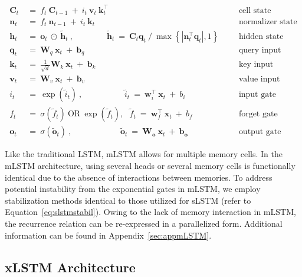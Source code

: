 \begin{align}
\label{eq:mlstm_recurrent_begin}
\mathbf{C}_t \ &= \  f_t \ \mathbf{C}_{t-1} \ + \ 
  i_t \ \mathbf{v}_t \ \mathbf{k}_t^\top & &  &\text{cell state} \\
\mathbf{n}_t \ &= \  f_t \ \mathbf{n}_{t-1} \ + \ 
  i_t \ \mathbf{k}_t & &  &\text{normalizer state} \\
\mathbf{h}_t  \ &= \ \mathbf{o}_t \ \odot \ \tilde{\mathbf{h}}_t
\ , \qquad \qquad 
\tilde{\mathbf{h}}_t \ = \   \mathbf{C}_t \mathbf{q}_t \ / \ 
  \max \left\{ |\mathbf{n}_t^\top \mathbf{q}_t|, 1 \right\} 
   &&&\text{hidden state} \\
\mathbf{q}_t \ &= \ \mathbf{W}_q \ \mathbf{x}_t \ + \ \mathbf{b}_q  & &  &\text{query input} \\
\mathbf{k}_t \ &= \ \frac{1}{\sqrt{d}} \mathbf{W}_k \ \mathbf{x}_t \ + \ \mathbf{b}_k  & &  &\text{key input} \\
\mathbf{v}_t \ &= \ \mathbf{W}_v \ \mathbf{x}_t \ + \ \mathbf{b}_v  & &  &\text{value input} \\
i_t \ &= \ \!\exp \!  \! \left( \tilde{i}_t  \right) \ , 
 \qquad \qquad \ \ \ \ \,
  \tilde{i}_t \ = \ \mathbf{w}^\top_{i} \ \mathbf{x}_t \ + \  b_{i} \ \ \ 
  &&&\text{input gate} \\
f_t \ &= \ \sigma \!  \left(  \tilde{f}_t \right) \ \text{OR} \ \!\exp \!  \! \left(  \tilde{f}_t \right) , \ \ \: \!
\tilde{f}_t \ = \ \mathbf{w}^\top_{f} \ \mathbf{x}_t  \ + \
  b_{f}
  &&& \text{forget gate} \\
\label{eq:mlstm_recurrent_end}
\mathbf{o}_t \ &= \ \sigma \left( \tilde{\mathbf{o}}_t \right) \ , \qquad \qquad \quad \ \ \ \,
  \tilde{\mathbf{o}}_t  \ = \ \mathbf{W}_{\mathbf{o}} \ \mathbf{x}_t \ + \
  \mathbf{b}_{\mathbf{o}}
  &&&\text{output gate} 
\end{align}

Like the traditional LSTM, mLSTM allows for multiple memory cells. In the mLSTM architecture, using several heads or several memory cells is functionally identical due to the absence of interactions between memories. To address potential instability from the exponential gates in mLSTM, we employ stabilization methods identical to those utilized for sLSTM (refer to Equation~\ref{eq:slstmstabil}). Owing to the lack of memory interaction in mLSTM, the recurrence relation can be re-expressed in a parallelized form. Additional information can be found in Appendix~\ref{sec:appmLSTM}.

\subsection{xLSTM Architecture}
\label{sec:xLSTMarch}

